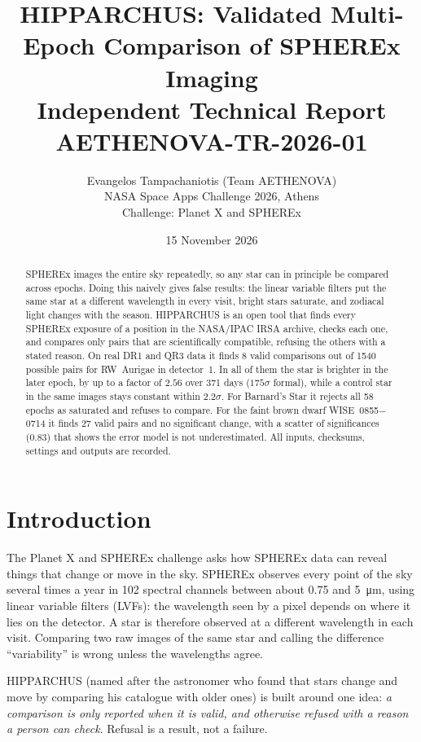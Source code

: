 \documentclass[11pt,a4paper]{article}
\title{HIPPARCHUS: Validated Multi-Epoch Comparison of SPHEREx Imaging\\
\large Independent Technical Report AETHENOVA-TR-2026-01}
\author{Evangelos Tampachaniotis (Team AETHENOVA) \\ NASA Space Apps Challenge 2026, Athens \\ \small Challenge: Planet X and SPHEREx}
\date{15 November 2026}
\begin{document}
\maketitle
\noindent{}

\begin{abstract}
SPHEREx images the entire sky repeatedly, so any star can in principle be compared across epochs. Doing this
naively gives false results: the linear variable filters put the same star at a different wavelength in every
visit, bright stars saturate, and zodiacal light changes with the season. HIPPARCHUS is an open tool that finds
every SPHEREx exposure of a position in the NASA/IPAC IRSA archive, checks each one, and compares only pairs that
are scientifically compatible, refusing the others with a stated reason. On real DR1 and QR3 data it finds
8 valid comparisons out of 1540 possible pairs for RW~Aurigae in detector~1. In all of them the star is brighter in the later
epoch, by up to a factor of $2.56$ over 371 days ($175\sigma$ formal), while a control star in the same images stays
constant within $2.2\sigma$. For Barnard's Star it rejects all 58 epochs as saturated and refuses to compare. For the faint
brown dwarf WISE~0855$-$0714 it finds 27 valid pairs and no significant change, with a scatter of significances
(0.83) that shows the error model is not underestimated. All inputs, checksums, settings and outputs are recorded.
\end{abstract}

\section{Introduction}
The Planet X and SPHEREx challenge asks how SPHEREx data can reveal things that change or move in the sky.
SPHEREx \parencite{dore2014} observes every point of the sky several times a year in 102 spectral channels between
about 0.75 and \SI{5}{\micro\meter}, using linear variable filters (LVFs): the wavelength seen by a pixel depends on
where it lies on the detector. A star is therefore observed at a different wavelength in each visit. Comparing two
raw images of the same star and calling the difference ``variability'' is wrong unless the wavelengths agree.

HIPPARCHUS (named after the astronomer who found that stars change and move by comparing his catalogue with older
ones) is built around one idea: \emph{a comparison is only reported when it is valid, and otherwise refused with a
reason a person can check}. Refusal is a result, not a failure.
\end{document}
